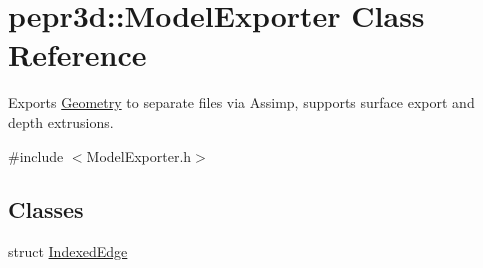 \hypertarget{classpepr3d_1_1_model_exporter}{}\section{pepr3d\+::Model\+Exporter Class Reference}
\label{classpepr3d_1_1_model_exporter}


Exports \mbox{\hyperlink{classpepr3d_1_1_geometry}{Geometry}} to separate files via Assimp, supports surface export and depth extrusions.  




{\ttfamily \#include $<$Model\+Exporter.\+h$>$}

\subsection*{Classes}
\begin{DoxyCompactItemize}
\item 
struct \mbox{\hyperlink{structpepr3d_1_1_model_exporter_1_1_indexed_edge}{Indexed\+Edge}}
\end{DoxyCompactItemize}
